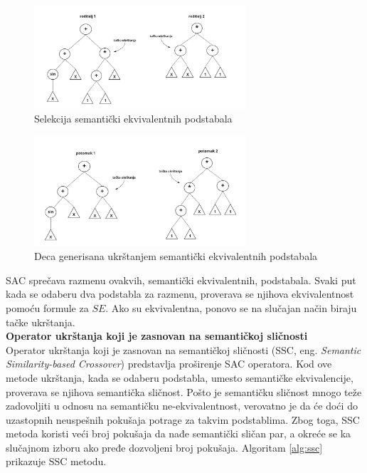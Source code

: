 \documentclass[main.tex]{subfiles}
\begin{document}
\begin{figure}[!ht]
\begin{center}
\includegraphics[width=0.7\textwidth]{../images/SAC1.jpg}
\end{center}
\caption{Selekcija semantički ekvivalentnih podstabala}
\label{fig:sac1}
\end{figure}

\begin{figure}[!ht]
\begin{center}
\includegraphics[width=0.7\textwidth]{../images/SAC2.jpg}
\end{center}
\caption{Deca generisana ukrštanjem semantički ekvivalentnih podstabala}
\label{fig:sac2}
\end{figure}

SAC sprečava razmenu ovakvih, semantički ekvivalentnih, podstabala. Svaki put kada se odaberu dva podstabla za razmenu, proverava se njihova ekvivalentnost pomoću formule za $SE$. Ako su ekvivalentna, ponovo se na slučajan način biraju tačke ukrštanja. \\

\textbf{Operator ukrštanja koji je zasnovan na semantičkoj sličnosti}
\\

Operator ukrštanja koji je zasnovan na semantičkoj sličnosti (SSC, eng. \textit{Semantic Similarity-based Crossover}) predstavlja proširenje SAC operatora. Kod ove metode ukrštanja, kada se odaberu podstabla, umesto semantičke ekvivalencije, proverava se njihova semantička sličnost. Pošto je semantičku sličnost mnogo teže zadovoljiti u odnosu na semantičku ne-ekvivalentnost, verovatno je da će doći do uzastopnih neuspešnih pokušaja potrage za takvim podstablima. Zbog toga, SSC metoda koristi veći broj pokušaja da nađe semantički sličan par, a okreće se ka slučajnom izboru ako pređe dozvoljeni broj pokušaja. Algoritam \autoref{alg:ssc} prikazuje SSC metodu.
\end{document}
